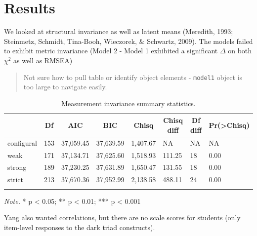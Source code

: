 \documentclass[
  english,
  man]{apa6}
\begin{document}
\hypertarget{results}{%
\section{Results}\label{results}}

We looked at structural invariance as well as latent means (Meredith, 1993; Steinmetz, Schmidt, Tina-Booh, Wieczorek, \& Schwartz, 2009). The models failed to exhibit metric invariance (Model 2 - Model 1 exhibited a significant \(\Delta\) on both \(\chi^2\) as well as RMSEA)

\begin{quote}
Not sure how to pull table or identify object elements - \texttt{model1} object is too large to navigate easily.
\end{quote}

\begin{table}[tbp]

\begin{center}
\begin{threeparttable}

\caption{\label{tab:measinv}Measurement invariance summary statistics.}

\begin{tabular}{llllllll}
\toprule
 & \multicolumn{1}{c}{Df} & \multicolumn{1}{c}{AIC} & \multicolumn{1}{c}{BIC} & \multicolumn{1}{c}{Chisq} & \multicolumn{1}{c}{Chisq diff} & \multicolumn{1}{c}{Df diff} & \multicolumn{1}{c}{Pr(>Chisq)}\\
\midrule
configural & 153 & 37,059.45 & 37,639.59 & 1,407.67 & NA & NA & NA\\
weak & 171 & 37,134.71 & 37,625.60 & 1,518.93 & 111.25 & 18 & 0.00\\
strong & 189 & 37,230.25 & 37,631.89 & 1,650.47 & 131.55 & 18 & 0.00\\
strict & 213 & 37,670.36 & 37,952.99 & 2,138.58 & 488.11 & 24 & 0.00\\
\bottomrule
\addlinespace
\end{tabular}

\begin{tablenotes}[para]
\normalsize{\textit{Note.} * p < 0.05; ** p < 0.01; *** p < 0.001}
\end{tablenotes}

\end{threeparttable}
\end{center}

\end{table}

Yang also wanted correlations, but there are no scale scores for students (only item-level responses to the dark triad constructs).
\end{document}

